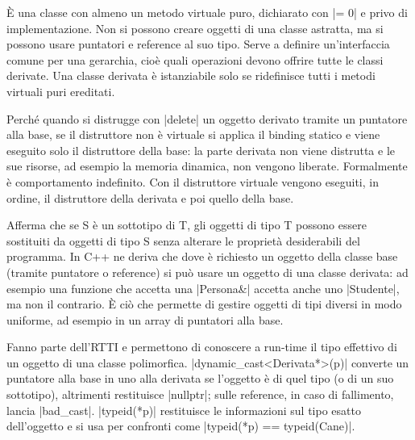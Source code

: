 \begin{orale}
È una classe con almeno un metodo virtuale puro, dichiarato con \cc|= 0| e privo di
implementazione. Non si possono creare oggetti di una classe astratta, ma si possono
usare puntatori e reference al suo tipo. Serve a definire un'interfaccia comune per una
gerarchia, cioè quali operazioni devono offrire tutte le classi derivate. Una classe
derivata è istanziabile solo se ridefinisce tutti i metodi virtuali puri ereditati.
\end{orale}

\begin{orale}
Perché quando si distrugge con \cc|delete| un oggetto derivato tramite un puntatore
alla base, se il distruttore non è virtuale si applica il binding statico e viene
eseguito solo il distruttore della base: la parte derivata non viene distrutta e le sue
risorse, ad esempio la memoria dinamica, non vengono liberate. Formalmente è
comportamento indefinito. Con il distruttore virtuale vengono eseguiti, in ordine, il
distruttore della derivata e poi quello della base.
\end{orale}

\begin{orale}
Afferma che se S è un sottotipo di T, gli oggetti di tipo T possono essere sostituiti
da oggetti di tipo S senza alterare le proprietà desiderabili del programma. In C++ ne
deriva che dove è richiesto un oggetto della classe base (tramite puntatore o
reference) si può usare un oggetto di una classe derivata: ad esempio una funzione che
accetta una \cc|Persona&| accetta anche uno \cc|Studente|, ma non il contrario. È ciò che
permette di gestire oggetti di tipi diversi in modo uniforme, ad esempio in un array di
puntatori alla base.
\end{orale}

\begin{orale}
Fanno parte dell'RTTI e permettono di conoscere a run-time il tipo effettivo di un
oggetto di una classe polimorfica. \cc|dynamic_cast<Derivata*>(p)| converte un puntatore
alla base in uno alla derivata se l'oggetto è di quel tipo (o di un suo sottotipo),
altrimenti restituisce \cc|nullptr|; sulle reference, in caso di fallimento, lancia
\cc|bad_cast|. \cc|typeid(*p)| restituisce le informazioni sul tipo esatto dell'oggetto e
si usa per confronti come \cc|typeid(*p) == typeid(Cane)|.
\end{orale}

